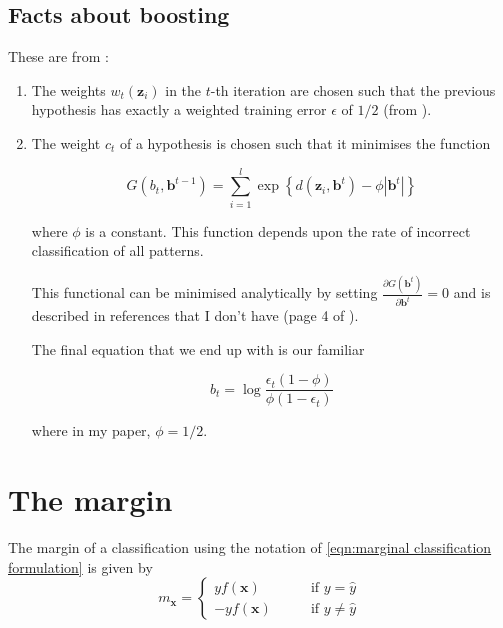 \subsection{Facts about boosting}


These are from \cite{Ratsch98}:

\begin{enumerate}

\item 	The weights $w_t(\mathbf{z}_i)$ in the $t$-th iteration
	are chosen such that the previous hypothesis has exactly a
	weighted training error $\epsilon$ of $1/2$ (from
	\cite{Schapire97}).

\item 	The weight $c_t$ of a hypothesis is chosen such that it
	minimises the function

	\begin{equation}
	G(b_t, \mathbf{b}^{t-1}) = \sum_{i=1}^l \exp 
	\left\{ d(\mathbf{z}_i, \mathbf{b}^t) - \phi | \mathbf{b}^t |
	\right\}
	\end{equation}

	where $\phi$ is a constant.  This function depends upon the
	rate of incorrect classification of all patterns.

	This functional can be minimised analytically by setting
	$\frac{\partial G(\mathbf{b}^t)}{\partial \mathbf{b}^t}=0$ and
	is described in references that I don't have (page 4 of
	\cite{Schapire97}).

	The final equation that we end up with is our familiar

	\begin{equation}
	b_t = \log \frac{\epsilon_t (1-\phi)}
	{\phi (1 - \epsilon_t)}
	\end{equation}

	where in my paper, $\phi=1/2$.

\end{enumerate}
 







\section{The margin}
\label{sec:the margin}

The margin of a classification using the notation of \ref{eqn:marginal
classification formulation} is given by
%
\begin{equation}
m_{\mathbf{x}} = \left\{ \begin{array}{rl}
yf(\mathbf{x})	& \qquad \mbox{if $y = \hat{y}$} \\
-yf(\mathbf{x})	& \qquad \mbox{if $y \neq \hat{y}$}
\end{array} \right.
\label{eqn:margin definition}
\end{equation}

